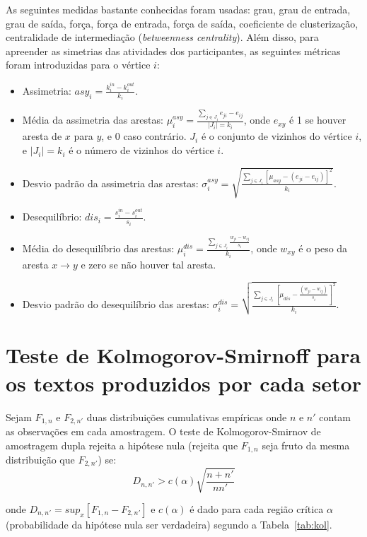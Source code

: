 \documentclass[a4paper,openright,12pt]{report} %
\begin{document}
As seguintes medidas bastante conhecidas foram usadas: grau, grau de entrada, grau de saída,
força, força de entrada, força de saída, coeficiente de clusterização,
centralidade de intermediação (\emph{betweenness centrality}).
Além disso, para apreender as simetrias das atividades dos participantes, as
seguintes métricas foram introduzidas para o vértice $i$:

\begin{itemize}
    \item Assimetria: $asy_i=\frac{k_i^{in}-k_i^{out}}{k_i}$.
    \item Média da assimetria das arestas: $\mu_i^{asy}=\frac{\sum_{j\in J_i} e_{ji}-e_{ij}}{|J_i|=k_i}$, onde $e_{xy}$ é 1 se houver aresta de $x$ para $y$, e $0$ caso contrário. $J_i$ é o conjunto de vizinhos do vértice $i$, e $|J_i|=k_i$ é o número de vizinhos do vértice $i$.
    \item Desvio padrão da assimetria das arestas: $\sigma_i^{asy}=\sqrt{\frac{\sum_{j\in J_i}[\mu_{asy} -(e_{ji}-e_{ij}) ]^2  }{k_i}  }$.
    \item Desequilíbrio: $dis_i=\frac{s_i^{in}-s_i^{out}}{s_i}$.
    \item Média do desequilíbrio das arestas: $\mu_i^{dis}=\frac{\sum_{j \in J_i}\frac{w_{ji}-w_{ij}}{s_i}}{k_i}$, onde $w_{xy}$ é o peso da aresta $x\rightarrow y$ e zero se não houver tal aresta.
    \item Desvio padrão do desequilíbrio das arestas: $\sigma_i^{dis}=\sqrt{\frac{\sum_{j\in J_i}[\mu_{dis}-\frac{(w_{ji}-w_{ij})}{s_i}]^2}{k_i}}$.
\end{itemize}

\section{Teste de Kolmogorov-Smirnoff para os textos produzidos por cada setor}\label{sec:kol}

Sejam $F_{1,n}$ e $F_{2,n'}$ duas distribuições cumulativas empíricas onde 
$n$ e $n'$ contam as observações em cada amostragem.
O teste de Kolmogorov-Smirnov de amostragem dupla 
rejeita a hipótese nula (rejeita que $F_{1,n}$ seja fruto da mesma distribuição que $F_{2,n'}$) se:
\begin{equation}\label{eq:ks}
D_{n,n'} > c(\alpha)\sqrt{\frac{n+n'}{nn'}}
\end{equation}

onde $D_{n,n'}=sup_x[F_{1,n}-F_{2,n'}]$ e $c(\alpha)$ é dado para cada região crítica $\alpha$
(probabilidade da hipótese nula ser verdadeira) segundo a Tabela~\ref{tab:kol}.
\end{document}
